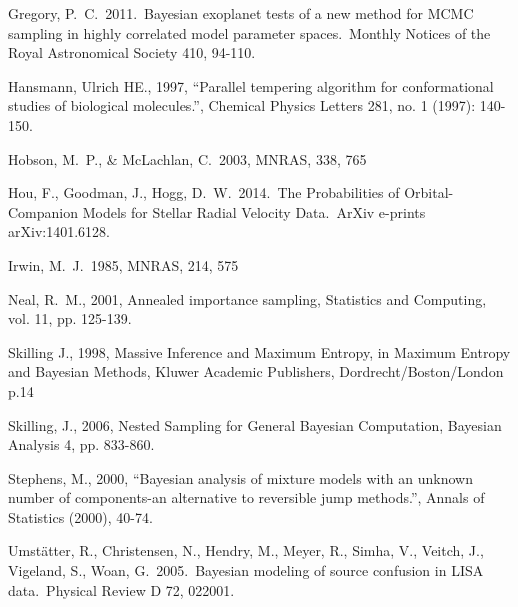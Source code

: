 \documentclass[letterpaper, 11pt]{article}
\begin{document}
\begin{thebibliography}{}
 Gregory, P.~C.\ 2011.\ 
Bayesian exoplanet tests of a new method for MCMC sampling in highly 
correlated model parameter spaces.\ Monthly Notices of the Royal 
Astronomical Society 410, 94-110.

 Hansmann, Ulrich HE., 1997, ``Parallel tempering algorithm for conformational studies of biological molecules.'', Chemical Physics Letters 281, no. 1 (1997): 140-150.

 Hobson, M.~P., \& McLachlan, C.\ 2003, MNRAS, 338, 765 

 Hou, F., Goodman, J., Hogg, 
D.~W.\ 2014.\ The Probabilities of Orbital-Companion Models for Stellar 
Radial Velocity Data.\ ArXiv e-prints arXiv:1401.6128.

 Irwin, M.~J.\ 1985, MNRAS, 214,
575

 Neal, R.~M., 2001, 
Annealed importance sampling, Statistics and Computing, vol. 11, pp. 125-139.

Skilling J., 1998, Massive Inference and Maximum Entropy, in Maximum Entropy
and Bayesian Methods, Kluwer Academic Publishers, Dordrecht/Boston/London p.14

 Skilling, J., 2006, Nested Sampling for General Bayesian Computation, Bayesian Analysis 4, pp. 833-860.

 Stephens, M., 2000, ``Bayesian analysis of mixture models with an unknown number of components-an alternative to reversible jump methods.'', Annals of Statistics (2000), 40-74.

 Umst{\"a}tter, 
R., Christensen, N., Hendry, M., Meyer, R., Simha, V., Veitch, J., 
Vigeland, S., Woan, G.\ 2005.\ Bayesian modeling of source confusion in 
LISA data.\ Physical Review D 72, 022001. 

\end{thebibliography}
\end{document}
